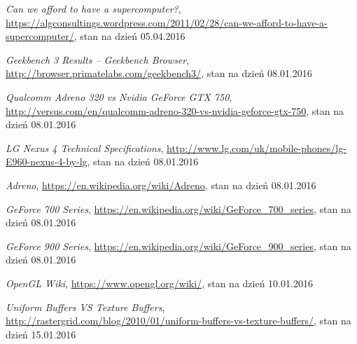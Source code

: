 \begin{thebibliography}{999}
 \emph{Can we afford to have a supercomputer?}, \linebreak \href{https://algconsultings.wordpress.com/2011/02/28/can-we-afford-to-have-a-supercomputer/}{https://algconsultings.wordpress.com/2011/02/28/can-we-afford-to-have-a-supercomputer/}, stan na dzień 05.04.2016

 \emph{Geekbench 3 Results -- Geekbench Browser}, \href{http://browser.primatelabs.com/geekbench3/}{http://browser.primatelabs.com/geekbench3/}, stan na dzień 08.01.2016

 \emph{Qualcomm Adreno 320 vs Nvidia GeForce GTX 750}, \href{http://versus.com/en/qualcomm-adreno-320-vs-nvidia-geforce-gtx-750}{http://versus.com/en/qualcomm-adreno-320-vs-nvidia-geforce-gtx-750}, stan na dzień 08.01.2016

 \emph{LG Nexus 4 Technical Specifications}, \href{http://www.lg.com/uk/mobile-phones/lg-E960-nexus-4-by-lg}{http://www.lg.com/uk/mobile-phones/lg-E960-nexus-4-by-lg}, stan na dzień 08.01.2016

 \emph{Adreno}, \href{https://en.wikipedia.org/wiki/Adreno}{https://en.wikipedia.org/wiki/Adreno}, stan na dzień 08.01.2016

 \emph{GeForce 700 Series}, \href{https://en.wikipedia.org/wiki/GeForce_700_series}{https://en.wikipedia.org/wiki/GeForce\_700\_series}, stan na dzień 08.01.2016

 \emph{GeForce 900 Series}, \href{https://en.wikipedia.org/wiki/GeForce_900_series}{https://en.wikipedia.org/wiki/GeForce\_900\_series}, stan na dzień 08.01.2016

 \emph{OpenGL Wiki}, \href{https://www.opengl.org/wiki/}{https://www.opengl.org/wiki/}, stan na dzień 10.01.2016

 \emph{Uniform Buffers VS Texture Buffers}, \href{http://rastergrid.com/blog/2010/01/uniform-buffers-vs-texture-buffers/}{http://rastergrid.com/blog/2010/01/uniform-buffers-vs-texture-buffers/}, stan na dzień 15.01.2016

\end{thebibliography}
